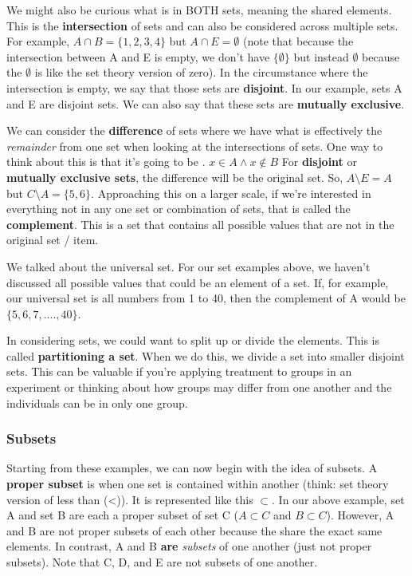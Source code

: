 \documentclass[
]{book}
\begin{document}
We might also be curious what is in BOTH sets, meaning the shared elements. This is the \textbf{intersection} of sets and can also be considered across multiple sets. For example, \(A \cap B =\{1, 2, 3, 4 \}\) but \(A \cap E = \emptyset\) (note that because the intersection between A and E is empty, we don't have \(\{\emptyset \}\) but instead \(\emptyset\) because the \(\emptyset\) is like the set theory version of zero). In the circumstance where the intersection is empty, we say that those sets are \textbf{disjoint}. In our example, sets A and E are disjoint sets. We can also say that these sets are \textbf{mutually exclusive}.

We can consider the \textbf{difference} of sets where we have what is effectively the \emph{remainder} from one set when looking at the intersections of sets. One way to think about this is that it's going to be . \(x \in A \wedge x \notin B\) For \textbf{disjoint} or \textbf{mutually exclusive sets}, the difference will be the original set. So, \(A \setminus E = A\) but \(C \setminus A = \{5, 6\}\). Approaching this on a larger scale, if we're interested in everything not in any one set or combination of sets, that is called the \textbf{complement}. This is a set that contains all possible values that are not in the original set / item.

We talked about the universal set. For our set examples above, we haven't discussed all possible values that could be an element of a set. If, for example, our universal set is all numbers from 1 to 40, then the complement of A would be \(\{5, 6, 7, ...., 40 \}\).

In considering sets, we could want to split up or divide the elements. This is called \textbf{partitioning a set}. When we do this, we divide a set into smaller disjoint sets. This can be valuable if you're applying treatment to groups in an experiment or thinking about how groups may differ from one another and the individuals can be in only one group.

\hypertarget{subsets}{%
\subsubsection{Subsets}\label{subsets}}

Starting from these examples, we can now begin with the idea of subsets. A \textbf{proper subset} is when one set is contained within another (think: set theory version of less than (\textless)). It is represented like this \(\subset\). In our above example, set A and set B are each a proper subset of set C (\(A \subset C\) and \(B \subset C\)). However, A and B are not proper subsets of each other because the share the exact same elements. In contrast, A and B \textbf{are} \emph{subsets} of one another (just not proper subsets). Note that C, D, and E are not subsets of one another.
\end{document}
